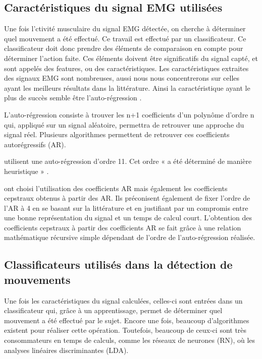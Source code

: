 \documentclass[letterpaper, twoside, 12pt, memoire, creativecommons, hyperref]{thETS}
\begin{document}
\subsection{Caractéristiques du signal EMG utilisées}

Une fois l’ctivité musculaire du signal EMG détectée, on cherche à déterminer quel mouvement a été effectué. Ce travail est effectué par un classificateur. Ce classificateur doit donc prendre des éléments de comparaison en compte pour déterminer l’action faite. Ces éléments doivent être significatifs du signal capté, et sont appelés des features, ou des caractéristiques. 
Les caractéristiques extraites des signaux EMG sont nombreuses, aussi nous nous concentrerons sur celles ayant les meilleurs résultats dans la littérature. Ainsi la caractéristique ayant le plus de succès semble être l’auto-régression \citep{Chang1996, Peleg2002, Maheu2011}.

L’auto-régression consiste à trouver les n+1 coefficients d’un polynôme d’ordre n qui, appliqué sur un signal aléatoire, permettra de retrouver une approche du signal réel. Plusieurs algorithmes permettent de retrouver ces coefficients autorégressifs (AR).

\cite{Peleg2002} utilisent une auto-régression d’ordre 11. Cet ordre « a été déterminé de manière heuristique » \citep{Peleg2002}.

\cite{Chang1996} ont choisi l'utilisation des coefficients AR mais également les coefficients cepstraux obtenus à partir des AR. Ils préconisent également de fixer l’ordre de l’AR à 4 en se basant sur la littérature et en justifiant par un compromis entre une bonne représentation du signal  et un temps de calcul court. 
L’obtention des coefficients cepstraux à partir des coefficients AR se fait grâce à une relation mathématique récursive simple dépendant de l’ordre de l'auto-régression réalisée. 


\subsection{Classificateurs utilisés dans la détection de mouvements}

Une fois les caractéristiques du signal calculées,  celles-ci sont entrées dans un classificateur qui, grâce à un apprentissage, permet de déterminer quel mouvement a été effectué par le sujet. Encore une fois, beaucoup d’algorithmes existent pour réaliser cette opération. Toutefois, beaucoup de ceux-ci sont très consommateurs en temps de calculs, comme les réseaux de neurones (RN), où les analyses linéaires discriminantes (LDA). 
\end{document}
